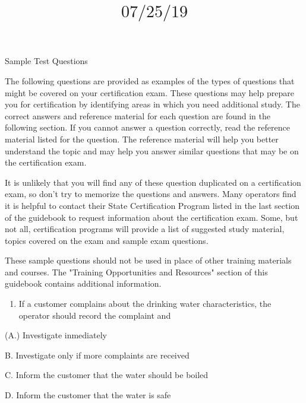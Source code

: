 \documentclass[10pt]{article}
\title{$07 / 25 / 19$ }
\author{}
\date{}
\begin{document}
\maketitle
Sample Test Questions

The following questions are provided as examples of the types of questions that might be covered on your certification exam. These questions may help prepare you for certification by identifying areas in which you need additional study. The correct answers and reference material for each question are found in the following section. If you cannot answer a question correctly, read the reference material listed for the question. The reference material will help you better understand the topic and may help you answer similar questions that may be on the certification exam.

It is unlikely that you will find any of these question duplicated on a certification exam, so don't try to memorize the questions and answers. Many operators find it is helpful to contact their State Certification Program listed in the last section of the guidebook to request information about the certification exam. Some, but not all, certification programs will provide a list of suggested study material, topics covered on the exam and sample exam questions.

These sample questions should not be used in place of other training materials and courses. The "Training Opportunities and Resources" section of this guidebook contains additional information.

\begin{enumerate}
  \item If a customer complains about the drinking water characteristics, the operator should record the complaint and
\end{enumerate}

(A.) Investigate inmediately

B. Investigate only if more complaints are received

C. Inform the customer that the water should be boiled

D. Inform the customer that the water is safe
\end{document}

